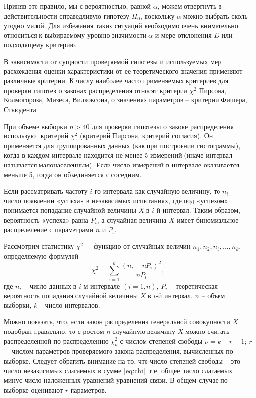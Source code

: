 Приняв это правило, мы с вероятностью, равной $\alpha$, можем отвергнуть в действительности справедливую гипотезу $H_0$, поскольку $\alpha$ можно выбрать сколь угодно малой. Для избежания таких ситуаций необходимо очень внимательно относиться к выбираемому уровню значимости $\alpha$ и мере отклонения $D$ или подходящему критерию.

В зависимости от сущности проверяемой гипотезы и используемых мер расхождения оценки характеристики от ее теоретического значения применяют различные критерии. К числу наиболее часто применяемых критериев для проверки гипотез о законах распределения относят критерии $\chi^2$ Пирсона, Колмогорова, Мизеса, Вилкоксона, о значениях параметров – критерии Фишера, Стьюдента.

При объеме выборки $n>40$ для проверки гипотезы о законе распределения используют критерий $\chi^2$ (критерий Пирсона, критерий согласия). Он применяется для группированных данных (как при построении гистограммы), когда в каждом интервале находится не менее 5 измерений (иначе интервал называется малонаселенным). Если число измерений в интервале оказывается меньше 5, тогда он объединяется с соседним.


Если рассматривать частоту $i$-го интервала как случайную величину, то  $n_i$ –- число появлений «успеха» в  независимых испытаниях, где под «успехом» понимается попадание случайной величины $X$ в $i$-й интервал. Таким образом, вероятность «успеха» равна $P_i$, а случайная величина $X$ имеет биномиальное распределение с параметрами $n$ и $P_i$.

Рассмотрим статистику $\chi^2$ –- функцию от случайных величин $n_1, n_2,n_3,...,n_k$, определяемую формулой
\begin{equation}\label{eq:chi}
  \chi^2=\sum\limits_{i=1}^k\frac{(n_i-nP_i)^2}{nP_i},
\end{equation}
где $n_i$ -- число данных в $i$-м интервале $(i=1,n)$, $P_i$ -- теоретическая вероятность попадания случайной величины $X$ в $i$-й интервал, $n$ -- объем выборки, $k$ -- число интервалов.

Можно показать, что, если закон распределения генеральной совокупности $X$ подобран правильно, то с ростом $n$ случайную величину $X$ можно считать распределенной по распределению $\chi_{\nu}^2$ с числом степеней свободы $\nu=k-r-1$; $r$ -– числом параметров проверяемого закона распределения, вычисленных по выборке. Следует обратить внимание на то, что число степеней свободы -- это число независимых слагаемых в сумме \eqref{eq:chi}, т.е. общее число слагаемых минус число наложенных уравнений уравнений связи. В общем случае по выборке оценивают $r$ параметров.

